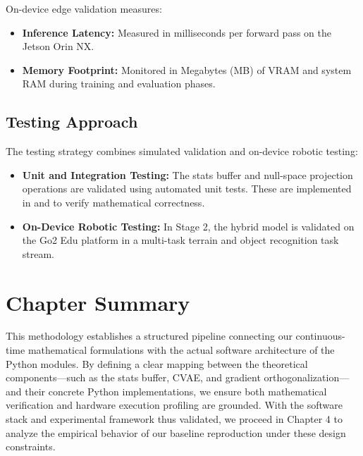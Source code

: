 On-device edge validation measures:
\begin{itemize}
    \item \textbf{Inference Latency:} Measured in milliseconds per forward pass on the Jetson Orin NX.
    \item \textbf{Memory Footprint:} Monitored in Megabytes (MB) of VRAM and system RAM during training and evaluation phases.
\end{itemize}

\subsection{Testing Approach}
The testing strategy combines simulated validation and on-device robotic testing:
\begin{itemize}
    \item \textbf{Unit and Integration Testing:} The stats buffer and null-space projection operations are validated using automated unit tests. These are implemented in \allowbreak{}\allowbreak{}\allowbreak{} and \allowbreak{}\allowbreak{} to verify mathematical correctness.
    \item \textbf{On-Device Robotic Testing:} In Stage 2, the hybrid model is validated on the Go2 Edu platform in a multi-task terrain and object recognition task stream.
\end{itemize}

\section{Chapter Summary}
\label{sec:methodology_summary}

This methodology establishes a structured pipeline connecting our continuous-time mathematical formulations with the actual software architecture of the Python modules. By defining a clear mapping between the theoretical components---such as the stats buffer, CVAE, and gradient orthogonalization---and their concrete Python implementations, we ensure both mathematical verification and hardware execution profiling are grounded. With the software stack and experimental framework thus validated, we proceed in Chapter 4 to analyze the empirical behavior of our baseline reproduction under these design constraints.
